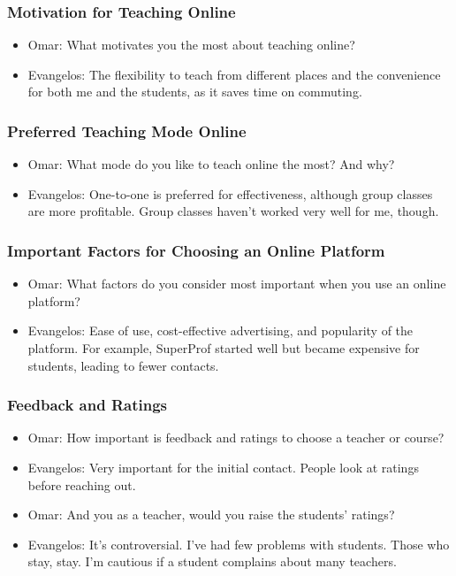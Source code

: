 \begin{enumerate}
\subsubsection*{Motivation for Teaching Online}
\begin{itemize}
\item Omar: What motivates you the most about teaching online?
\item Evangelos: The flexibility to teach from different places and the convenience for both me and the students, as it saves time on commuting.
\end{itemize}

\subsubsection*{Preferred Teaching Mode Online}
\begin{itemize}
\item Omar: What mode do you like to teach online the most?
And why?
\item Evangelos: One-to-one is preferred for effectiveness, although group classes are more profitable.
Group classes haven’t worked very well for me, though.
\end{itemize}

\subsubsection*{Important Factors for Choosing an Online Platform}
\begin{itemize}
\item Omar: What factors do you consider most important when you use an online platform?
\item Evangelos: Ease of use, cost-effective advertising, and popularity of the platform.
For example, SuperProf started well but became expensive for students, leading to fewer contacts.
\end{itemize}

\subsubsection*{Feedback and Ratings}
\begin{itemize}
\item Omar: How important is feedback and ratings to choose a teacher or course?
\item Evangelos: Very important for the initial contact.
People look at ratings before reaching out.
\item Omar: And you as a teacher, would you raise the students' ratings?
\item Evangelos: It’s controversial.
I’ve had few problems with students.
Those who stay, stay.
I’m cautious if a student complains about many teachers.
\end{itemize}


\end{enumerate}
